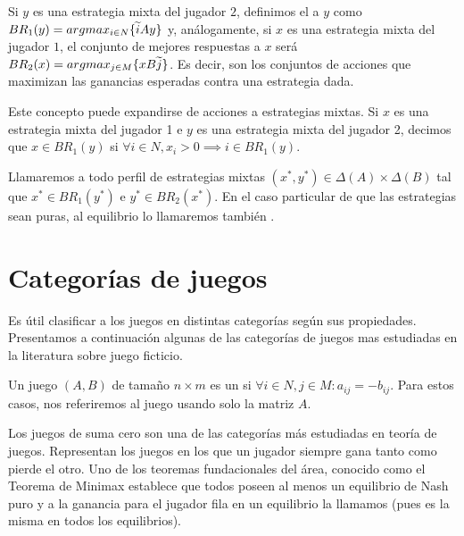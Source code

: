 Si $y$ es una estrategia mixta del jugador $2$, definimos el  a $y$ como $BR_1(y) = argmax_{i \in N}\{\widetilde{i}Ay\}$ y, análogamente, si $x$ es una estrategia mixta del jugador $1$, el conjunto de mejores respuestas a $x$ será $BR_2(x) = argmax_{j \in M}\{xB\widetilde{j}\}$. Es decir, son los conjuntos de acciones que maximizan las ganancias esperadas contra una estrategia dada.

Este concepto puede expandirse de acciones a estrategias mixtas. Si $x$ es una estrategia mixta del jugador 1 e $y$ es una estrategia mixta del jugador 2, decimos que $x \in BR_1(y)$ si $\forall i \in N, x_i > 0 \implies i \in BR_1(y)$.

Llamaremos  a todo perfil de estrategias mixtas $(x^*, y^*) \in \Delta(A) \times \Delta(B)$ tal que $x^* \in BR_1(y^*)$ e $y^* \in BR_2(x^*)$. En el caso particular de que las estrategias sean puras, al equilibrio lo llamaremos también .

\section{Categorías de juegos}

Es útil clasificar a los juegos en distintas categorías según sus propiedades. Presentamos a continuación algunas de las categorías de juegos mas estudiadas en la literatura sobre juego ficticio.

\begin{definition}
    Un juego $(A, B)$ de tamaño $n \times m$ es un  si $\forall i \in N, j \in M : a_{ij} = -b_{ij}$. Para estos casos, nos referiremos al juego usando solo la matriz $A$.
\end{definition}

Los juegos de suma cero son una de las categorías más estudiadas en teoría de juegos. Representan los juegos en los que un jugador siempre gana tanto como pierde el otro. Uno de los teoremas fundacionales del área, conocido como el Teorema de Minimax \cite{nash:minimax} establece que todos poseen al menos un equilibrio de Nash puro y a la ganancia para el jugador fila en un equilibrio la llamamos  (pues es la misma en todos los equilibrios).

